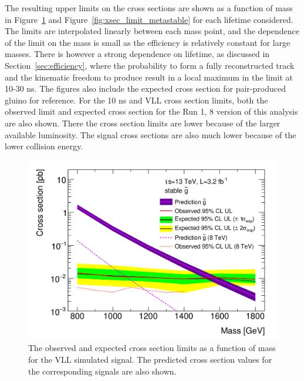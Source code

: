 The resulting upper limits on the cross sections are shown as a function of mass in Figure~\ref{fig:xsec_limit_stable} and Figure~\ref{fig:xsec_limit_metastable} for each lifetime considered.
The limits are interpolated linearly between each mass point, and the dependence of the limit on the mass is small as the efficiency is relatively constant for large \rhadron masses.
There is however a strong dependence on lifetime, as discussed in Section~\ref{sec:efficiency}, where the probability to form a fully reconstructed track and the kinematic freedom to produce \met result in a local maximum in the limit at 10-30 ns.
The figures also include the expected cross section for pair-produced gluino \rhadrons for reference.
For the 10 ns and \ac{VLL} cross section limits, both the observed limit and expected cross section for the Run 1, 8 \TeV version of this analysis are also shown.
There the cross section limits are lower because of the larger available luminosity. 
The signal cross sections are also much lower because of the lower collision energy.

\begin{figure}
\centering
\includegraphics[width=\fullfig]{figures/xsec_limit_stable.png}
\caption{The observed and expected cross section limits as a function of mass for the \acs*{VLL} simulated signal. The predicted cross section values for the corresponding signals are also shown. }
\label{fig:xsec_limit_stable}
\end{figure}

